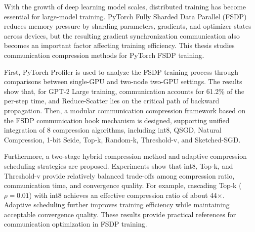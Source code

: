 \begin{eabstract}

With the growth of deep learning model scales, distributed training has become essential for large-model training. PyTorch Fully Sharded Data Parallel (FSDP) reduces memory pressure by sharding parameters, gradients, and optimizer states across devices, but the resulting gradient synchronization communication also becomes an important factor affecting training efficiency. This thesis studies communication compression methods for PyTorch FSDP training.

First, PyTorch Profiler is used to analyze the FSDP training process through comparisons between single-GPU and two-node two-GPU settings. The results show that, for GPT-2 Large training, communication accounts for 61.2\% of the per-step time, and Reduce-Scatter lies on the critical path of backward propagation. Then, a modular communication compression framework based on the FSDP communication hook mechanism is designed, supporting unified integration of 8 compression algorithms, including int8, QSGD, Natural Compression, 1-bit Seide, Top-k, Random-k, Threshold-v, and Sketched-SGD.

Furthermore, a two-stage hybrid compression method and adaptive compression scheduling strategies are proposed. Experiments show that int8, Top-k, and Threshold-v provide relatively balanced trade-offs among compression ratio, communication time, and convergence quality. For example, cascading Top-k (\(\rho=0.01\)) with int8 achieves an effective compression ratio of about 44\(\times\). Adaptive scheduling further improves training efficiency while maintaining acceptable convergence quality. These results provide practical references for communication optimization in FSDP training.

\end{eabstract}

